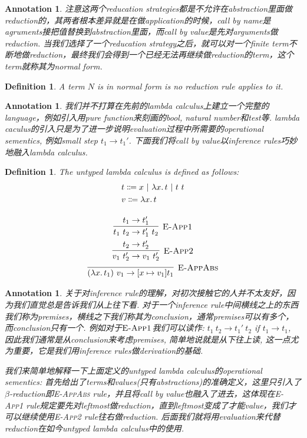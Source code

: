 \documentclass{article}
\newtheorem{definition}[theorem]{Definition}
\newtheorem{annotation}[theorem]{Annotation}
\newcommand{\lam}[2]{\ensuremath{\lambda #1\ldotp #2}} %
\begin{document}
\begin{annotation}
\rm 注意这两个reducation strategies都是不允许在abstraction里面做reduction的，其两者根本差异就是在做application的时候，call by name是agruments接把值替换到abstraction里面，而call by value是先对arguments做reduction. 当我们选择了一个reducation strategy之后，就可以对一个finite term不断地做reduction，最终我们会得到一个已经无法再继续做reduction的term，这个term就称其为\emph{normal form}.
\end{annotation}

\begin{definition}
\rm A term $N$ is in \emph{normal form} is no reduction rule applies to it.
\end{definition}

\begin{annotation}
\rm 我们并不打算在先前的lambda calculus上建立一个完整的language，例如引入用pure function来刻画的bool, natural number和test等. lambda caculus的引入只是为了进一步说明evaluation过程中所需要的\emph{operational sementics}, 例如small step $t_1 \to t_1'$. 下面我们将\emph{call by value}以inference rules巧妙地融入lambda calculus.
\end{annotation}

\begin{definition}
\rm The untyped lambda calculus is defined as follows:
\[
	\begin{gathered}
	\begin{aligned}
	&t \Coloneqq x ~|~ \lam{x}{t} ~|~ t~t \\
	&v \Coloneqq \lam{x}{t}
	\end{aligned} \\[1em]
	\infer[\textsc{E-App1}]{t_1~t_2 \to t_1'~t_2}{t_1 \to t_1'} \\
	\infer[\textsc{E-App2}]{v_1~t_2' \to v_1~t_2'}{t_2 \to t_2'} \\
	\infer[\textsc{E-AppAbs}]{(\lam{x}{t_1})~v_1 \to [x \mapsto v_1] t_1}{}
	\end{gathered}
\]
\end{definition}

\begin{annotation}
\rm 关于对inference rule的理解，对初次接触它的人并不太友好，因为我们直觉总是告诉我们从上往下看. 对于一个inference rule中间横线之上的东西我们称为premises，横线之下我们称其为conclusion，通常premises可以有多个，而conclusion只有一个. 例如对于$\textsc{E-App1}$我们可以读作: $t_1~t_2 \to t_1'~t_2$ if $t_1 \to t_1$, 因此我们通常是从conclusion来考虑premises, 简单地说就是从下往上读, 这一点尤为重要，它是我们用inference rules做derivation的基础. 

我们来简单地解释一下上面定义的untyped lambda calculus的operational sementics: 首先给出了terms和values(只有abstractions)的准确定义，这里只引入了$\beta$-reduction即\textsc{E-AppAbs} rule，并且将\emph{call by value}也融入了进去，这体现在\textsc{E-App1} rule规定要先对leftmost做reduction，直到leftmost变成了才能value，我们才可以继续使用\textsc{E-App2} rule往右做reduction. 后面我们就将用evaluation来代替reduction在如今untyped lambda calculus中的使用.
\end{annotation}
\end{document}
